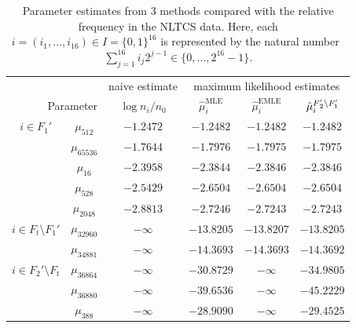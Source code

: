\documentclass[aos,noinfoline]{imsart}
\DeclareMathOperator{\MLE}{MLE}
\DeclareMathOperator{\EMLE}{EMLE}
\newcommand{\hmuFF}{\hat{\mu}^{F\smash{'_2\setminus F'_1}}}
\theoremstyle{remark}
\theoremstyle{definition}
\begin{document}
 

\begin{table}[t]
  \centering
  \caption{Parameter estimates from 3 methods compared with the relative frequency in the NLTCS data.  Here, each $i=(i_{1},\dots,i_{16})\in I=\{0,1\}^{16}$ is represented by the natural number~$\sum_{j=1}^{16}i_{j}2^{j-1}\in\{0,\dots,2^{16}-1\}$.}
  \begin{tabular}{cccccc} %
    \toprule %
    &           & naive estimate & \multicolumn{3}{c}{maximum likelihood estimates} \\ %
     \multicolumn{2}{r}{Parameter}
    &  $\log n_{i}/n_{0}$ &  $\hat{\mu}^{\MLE}_{i}$ & $\hat{\mu}^{\EMLE}_{i}$ & $\hmuFF_{i}$ \\
    \hline
    \rowcolor{green} $i\in F_{1}'$ &  $\mu_{512}$ %
    &  $-1.2472$  &  $-1.2482$ &  $-1.2482$  &  $-1.2482$ \\
    \rowcolor{green}               & $\mu_{65536}$  &  $-1.7644$  &  $-1.7976$ &  $-1.7975$  &  $-1.7975$ \\ %
    \rowcolor{green}               & $\mu_{16}$    &  $-2.3958$  &  $-2.3844$ &  $-2.3846$  &  $-2.3846$ \\ %
    \rowcolor{green}               & $\mu_{528}$   &  $-2.5429$  &  $-2.6504$ &  $-2.6504$  &  $-2.6504$ \\ %
    \rowcolor{green}               & $\mu_{2048}$  &  $-2.8813$  &  $-2.7246$ &  $-2.7243$  &  $-2.7243$ \\ %
    \hline
    \rowcolor{LRed} $i\in F_{t}\setminus F_{1}'$ &  $\mu_{32960}$ &  $-\infty$ & $-13.8205$ & $-13.8207$  & $-13.8205$  \\ %
    \rowcolor{LRed}                & $\mu_{34881}$ & $-\infty$ & $-14.3693$ & $-14.3693$ &  $-14.3692$  \\ %
    \hline
    \rowcolor{yellow} $i\in F_{2}'\setminus F_{t}$ & $\mu_{36864}$ & $-\infty$  & $-30.8729$  &    $-\infty$ & $-34.9805$ \\ %
    \rowcolor{yellow} & $\mu_{36880}$ & $-\infty$ & $-39.6536$ &   $-\infty$  & $-45.2229$ \\  %
    \rowcolor{yellow} & $\mu_{388}$   & $-\infty$ & $-28.9090$ &    $-\infty$ &  $-29.4525$ \\ %

\end{tabular}
\end{table}
\end{document}
